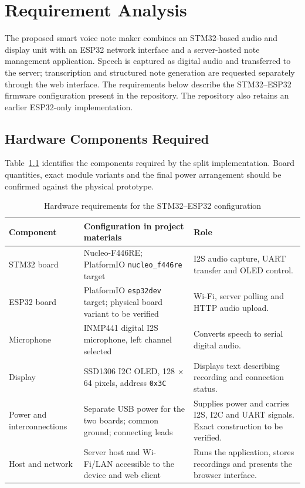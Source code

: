 \chapter{Requirement Analysis}
\label{ch:requirements}

The proposed smart voice note maker combines an STM32-based audio and display unit with an ESP32 network interface and a server-hosted note management application. Speech is captured as digital audio and transferred to the server; transcription and structured note generation are requested separately through the web interface. The requirements below describe the STM32--ESP32 firmware configuration present in the repository. The repository also retains an earlier ESP32-only implementation.

\section{Hardware Components Required}
Table~\ref{tab:hardware} identifies the components required by the split implementation. Board quantities, exact module variants and the final power arrangement should be confirmed against the physical prototype.
\begin{table}[htbp]
\centering
\caption{Hardware requirements for the STM32--ESP32 configuration}
\label{tab:hardware}
\small
\begin{tabularx}{\textwidth}{@{}lX X@{}}
\toprule
Component & Configuration in project materials & Role \\
\midrule
STM32 board & Nucleo-F446RE; PlatformIO \texttt{nucleo\_f446re} target & I2S audio capture, UART transfer and OLED control. \\
ESP32 board & PlatformIO \texttt{esp32dev} target; physical board variant to be verified & Wi-Fi, server polling and HTTP audio upload. \\
Microphone & INMP441 digital I2S microphone, left channel selected & Converts speech to serial digital audio. \\
Display & SSD1306 I2C OLED, 128 $\times$ 64 pixels, address \texttt{0x3C} & Displays text describing recording and connection status. \\
Power and interconnections & Separate USB power for the two boards; common ground; connecting leads & Supplies power and carries I2S, I2C and UART signals. Exact construction to be verified. \\
Host and network & Server host and Wi-Fi/LAN accessible to the device and web client & Runs the application, stores recordings and presents the browser interface. \\
\bottomrule
\end{tabularx}
\end{table}


